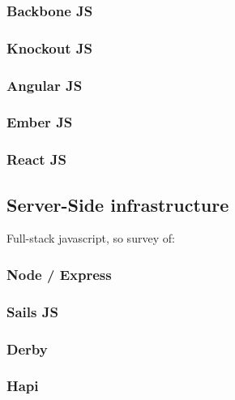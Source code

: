 		\subsubsection{Backbone JS}
		\label{sssect:backbone}
		
		\subsubsection{Knockout JS}
		\label{sssect:knockout}
		
		\subsubsection{Angular JS}
		\label{sssect:angular}
		
		\subsubsection{Ember JS}
		\label{sssect:ember}
		
		\subsubsection{React JS}
		\label{sssect:react}


	\subsection{Server-Side infrastructure}
	\label{ssect:sw_framework_server_side}
	
	Full-stack javascript, so survey of:
	
		\subsubsection{Node / Express}
		\label{sssect:nodeexp}
		
		\subsubsection{Sails JS}
		\label{sssect:sails}
		
		\subsubsection{Derby}
		\label{sssect:derby}
		
		\subsubsection{Hapi}
		\label{sssect:hapi}
		
